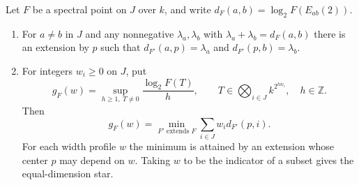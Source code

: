 \begin{theorem}\label{thm:extension}
Let $F$ be a spectral point on $J$ over $k$, and write
$d_F(a,b)=\log_2 F(E_{ab}(2))$.
\begin{enumerate}
\item For $a\ne b$ in $J$ and any nonnegative $\lambda_a,\lambda_b$ with
$\lambda_a+\lambda_b=d_F(a,b)$ there is an extension by $p$ such
that $d_{F'}(a,p)=\lambda_a$ and $d_{F'}(p,b)=\lambda_b$.
\item For integers $w_i\ge 0$ on $J$, put
\[
 g_F(w)=\sup_{h\ge1,\ T\ne0}
                  \frac{\log_2 F(T)}h ,
 \qquad T\in\bigotimes_{i\in J} k^{2^{hw_i}},
 \quad h\in\mathbb Z.
\]
Then
\begin{equation}\label{eq:spectral-star}
                 g_F(w)=\min_{F'\text{ extends }F}
                             \sum_{i\in J} w_i d_{F'}(p,i).
\end{equation}
For each width profile $w$ the minimum is attained by an extension
whose center $p$ may depend on $w$. Taking $w$ to be the indicator
of a subset gives the equal-dimension star.
\end{enumerate}
\end{theorem}
